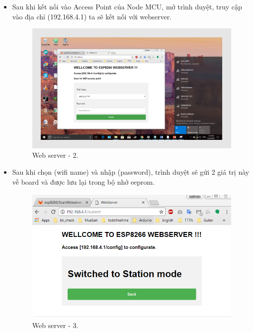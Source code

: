 \documentclass[a4paper,12pt,oneside]{article}
\begin{document}
\begin{enumerate}
\begin{itemize}
\begin{itemize}
			\item Sau khi kết nối vào Access Point của Node MCU, mở trình duyệt, truy cập vào địa chỉ (192.168.4.1) ta sẽ kết nối với webserver.
			\begin{figure}[H]
			\centering
			\includegraphics[scale=.9]{hinh/webserver_2.PNG}
			\caption{Web server - 2.}
			\end{figure}
			
			\item Sau khi chọn (wifi name) và nhập (password), trình duyệt sẽ gửi 2 giá trị này về board và được lưu lại trong bộ nhớ eeprom.
			\begin{figure}[H]
			\centering
			\includegraphics[scale=.7]{hinh/webserver_3.PNG}
			\caption{Web server - 3.}
			\end{figure}
			

\end{itemize}
\end{itemize}
\end{enumerate}
\end{document}
